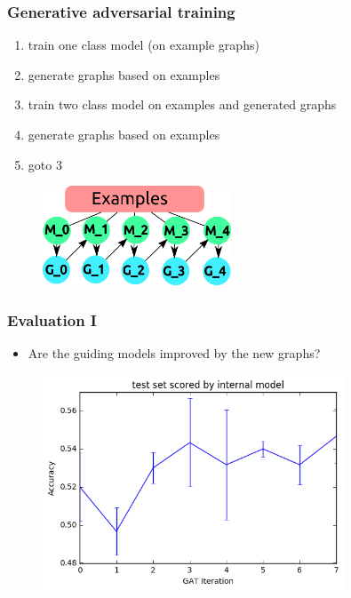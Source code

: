 \documentclass{beamer}
\begin{document}
\begin{frame}
    \frametitle{Generative adversarial training}
    \begin{enumerate}

        \item train one class model (on example graphs)
        \item generate graphs based on examples
        \item train two class model on examples and generated graphs
        \item generate graphs based on examples
        \item goto 3
    \end{enumerate}
    \begin{figure}[ht]
        \centering
        \includegraphics[width=0.5\textwidth]{images/gat.png}
    \end{figure}
\end{frame}



\begin{frame}
    \frametitle{Evaluation I}
    \begin{itemize}
        \item Are the guiding models improved by the new graphs?
    \end{itemize}

   \begin{figure}[ht]
        \centering
        \includegraphics[width=0.80\textwidth]{images/eval1.png}
    \end{figure}
\end{frame}
\end{document}
